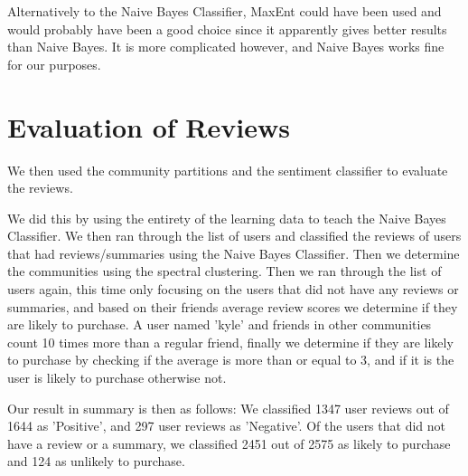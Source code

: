 	Alternatively to the Naive Bayes Classifier, MaxEnt could have been used and would probably have been a good choice since it apparently gives better results than Naive Bayes. It is more complicated however, and Naive Bayes works fine for our purposes. 
	
	\section{Evaluation of Reviews}
	We then used the community partitions and the sentiment classifier to evaluate the reviews. 

	We did this by using the entirety of the learning data to teach the Naive Bayes Classifier.
	We then ran through the list of users and classified the reviews of users that had reviews/summaries using the Naive Bayes Classifier.
	Then we determine the communities using the spectral clustering.
	Then we ran through the list of users again, this time only focusing on the users that did not have any reviews or summaries, and based on their friends average review scores we determine if they are likely to purchase. A user named 'kyle' and friends in other communities count 10 times more than a regular friend, finally we determine if they are likely to purchase by checking if the average is more than or equal to 3, and if it is the user is likely to purchase otherwise not.
	
	Our result in summary is then as follows:
	We classified 1347 user reviews out of 1644 as 'Positive', and 297 user reviews as 'Negative'.
	Of the users that did not have a review or a summary, we classified 2451 out of 2575 as likely to purchase and 124 as unlikely to purchase.	


